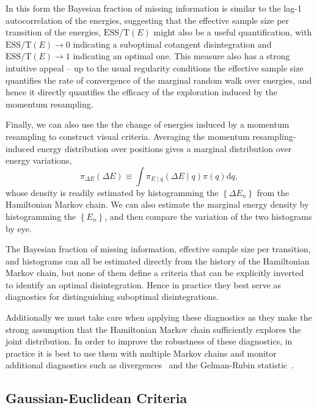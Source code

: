 \documentclass[stslayout]{imsart}
\newcommand\dd{\mathrm{d}}
\begin{document}
In this form the Bayesian fraction of missing information is similar
to the lag-1 autocorrelation of the energies, suggesting that the
effective sample size per transition of the energies, 
$\mathrm{ESS/T} \! \left( E \right)$ might also be a 
useful quantification, with 
$\mathrm{ESS/T} \! \left( E \right) \rightarrow 0$ indicating
a suboptimal cotangent disintegration and 
$\mathrm{ESS/T} \! \left( E \right) \rightarrow 1$ indicating
an optimal one.  This measure also has a strong intuitive appeal -- 
up to the usual regularity conditions the effective sample size 
quantifies the rate of convergence of the marginal random walk
over energies, and hence it directly quantifies the efficacy of the 
exploration induced by the momentum resampling.

Finally, we can also use the the change of energies induced by a
momentum resampling to construct visual criteria.  Averaging the
momentum resampling-induced energy distribution over positions 
gives a marginal distribution over energy variations,
%
\begin{equation*}
\pi_{\Delta E} \! \left( \Delta E \right) \equiv
\int \pi_{E \mid q} \! \left( \Delta E \mid q \right) \pi \! \left( q \right) \dd q,
\end{equation*}
%
whose density is readily estimated by histogramming the 
$\left\{ \Delta E_{n} \right\}$ from the Hamiltonian Markov chain.  
We can also estimate the marginal energy density by histogramming 
the $\left\{ E_{n} \right\}$, and then compare the variation of the two
histograms by eye.

The Bayesian fraction of missing information, effective sample size
per transition, and histograms can all be estimated directly from
the history of the Hamiltonian Markov chain, but none of them define 
a criteria that can be explicitly inverted to identify an optimal disintegration.  
Hence in practice they best serve as diagnostics for distinguishing 
suboptimal disintegrations. 

Additionally we must take care when applying these diagnostics as they 
make the strong assumption that the Hamiltonian Markov chain sufficiently 
explores the joint distribution.  In order to improve the robustness of these 
diagnostics, in practice it is best to use them with multiple Markov chains
and monitor additional diagnostics such as 
divergences~\citep{BetancourtEtAl:2014b, BetancourtEtAl:2015} and 
the Gelman-Rubin statistic~\citep{GelmanEtAl:1992}.

\subsection{Gaussian-Euclidean Criteria}
\end{document}
